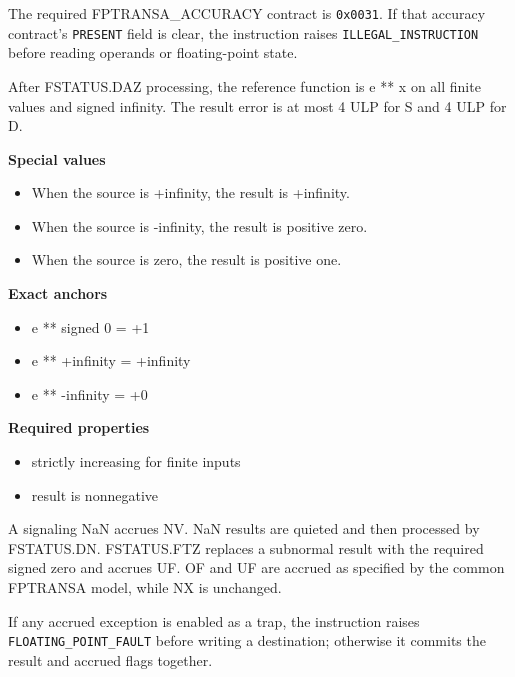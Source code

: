 The required FPTRANSA\_ACCURACY contract is \texttt{0x0031}. If that accuracy contract's \texttt{PRESENT} field is clear, the instruction raises \texttt{ILLEGAL\_INSTRUCTION} before reading operands or floating-point state.

After FSTATUS.DAZ processing, the reference function is e ** x on all finite values and signed infinity. The result error is at most 4 ULP for S and 4 ULP for D.

\textbf{Special values}\par
\begin{itemize}
\item When the source is +infinity, the result is +infinity.
\item When the source is -infinity, the result is positive zero.
\item When the source is zero, the result is positive one.
\end{itemize}

\textbf{Exact anchors}\par
\begin{itemize}
\item e ** signed 0 = +1
\item e ** +infinity = +infinity
\item e ** -infinity = +0
\end{itemize}

\textbf{Required properties}\par
\begin{itemize}
\item strictly increasing for finite inputs
\item result is nonnegative
\end{itemize}

A signaling NaN accrues NV. NaN results are quieted and then processed by FSTATUS.DN. FSTATUS.FTZ replaces a subnormal result with the required signed zero and accrues UF. OF and UF are accrued as specified by the common FPTRANSA model, while NX is unchanged.

If any accrued exception is enabled as a trap, the instruction raises \texttt{FLOATING\_POINT\_FAULT} before writing a destination; otherwise it commits the result and accrued flags together.
